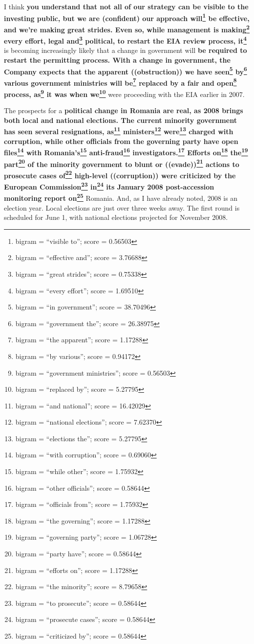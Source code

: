 \documentclass{article}
\begin{document}
 I think \textbf{you understand that not all of our strategy can be visible to the investing public, but we are (confident) our approach will\footnote{bigram = ``visible to''; score = 0.56503} be effective, and we're making great strides. Even so, while management is making\footnote{bigram = ``effective and''; score = 3.76688} every effort, legal and\footnote{bigram = ``great strides''; score = 0.75338} political, to restart the EIA review process, it\footnote{bigram = ``every effort''; score = 1.69510}} is becoming increasingly likely that a change in government will \textbf{be required to restart the permitting process. With a change in government, the Company expects that the apparent ((obstruction)) we have seen\footnote{bigram = ``in government''; score = 38.70496} by\footnote{bigram = ``government the''; score = 26.38975} various government ministries will be\footnote{bigram = ``the apparent''; score = 1.17288} replaced by a fair and open\footnote{bigram = ``by various''; score = 0.94172} process, as\footnote{bigram = ``government ministries''; score = 0.56503} it was when we\footnote{bigram = ``replaced by''; score = 5.27795}} were proceeding with the EIA earlier in 2007. 

 The prospects for a \textbf{political change in Romania are real, as 2008 brings both local and national elections. The current minority government has seen several resignations, as\footnote{bigram = ``and national''; score = 16.42029} ministers\footnote{bigram = ``national elections''; score = 7.62370} were\footnote{bigram = ``elections the''; score = 5.27795} charged with corruption, while other officials from the governing party have open files\footnote{bigram = ``with corruption''; score = 0.69060} with Romania's\footnote{bigram = ``while other''; score = 1.75932} anti-fraud\footnote{bigram = ``other officials''; score = 0.58644} investigators.\footnote{bigram = ``officials from''; score = 1.75932} Efforts on\footnote{bigram = ``the governing''; score = 1.17288} the\footnote{bigram = ``governing party''; score = 1.06728} part\footnote{bigram = ``party have''; score = 0.58644} of the minority government to blunt or ((evade))\footnote{bigram = ``efforts on''; score = 1.17288} actions to prosecute cases of\footnote{bigram = ``the minority''; score = 8.79658} high-level ((corruption)) were criticized by the European Commission\footnote{bigram = ``to prosecute''; score = 0.58644} in\footnote{bigram = ``prosecute cases''; score = 0.58644} its January 2008 post-accession monitoring report on\footnote{bigram = ``criticized by''; score = 0.58644}} Romania. And, as I have already noted, 2008 is an election year. Local elections are just over three weeks away. The first round is scheduled for June 1, with national elections projected for November 2008. 
\end{document}

